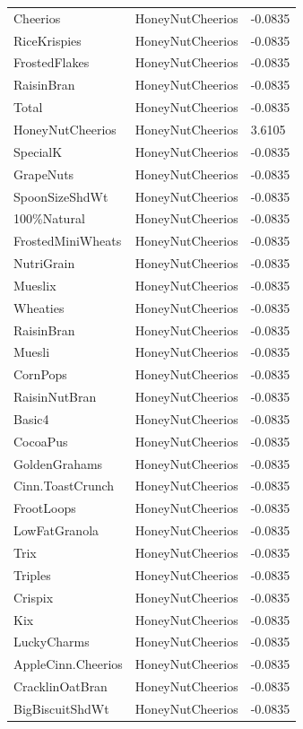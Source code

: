 \begin{table}[!htbp]
\begin{tabular}{lll}
Cheerios & HoneyNutCheerios & -0.0835
\\
RiceKrispies & HoneyNutCheerios & -0.0835
\\
FrostedFlakes & HoneyNutCheerios & -0.0835
\\
RaisinBran & HoneyNutCheerios & -0.0835
\\
Total & HoneyNutCheerios & -0.0835
\\
HoneyNutCheerios & HoneyNutCheerios & 3.6105
\\
SpecialK & HoneyNutCheerios & -0.0835
\\
GrapeNuts & HoneyNutCheerios & -0.0835
\\
SpoonSizeShdWt & HoneyNutCheerios & -0.0835
\\
100\%Natural & HoneyNutCheerios & -0.0835
\\
FrostedMiniWheats & HoneyNutCheerios & -0.0835
\\
NutriGrain & HoneyNutCheerios & -0.0835
\\
Mueslix & HoneyNutCheerios & -0.0835
\\
Wheaties & HoneyNutCheerios & -0.0835
\\
RaisinBran & HoneyNutCheerios & -0.0835
\\
Muesli & HoneyNutCheerios & -0.0835
\\
CornPops & HoneyNutCheerios & -0.0835
\\
RaisinNutBran & HoneyNutCheerios & -0.0835
\\
Basic4 & HoneyNutCheerios & -0.0835
\\
CocoaPus & HoneyNutCheerios & -0.0835
\\
GoldenGrahams & HoneyNutCheerios & -0.0835
\\
Cinn.ToastCrunch & HoneyNutCheerios & -0.0835
\\
FrootLoops & HoneyNutCheerios & -0.0835
\\
LowFatGranola & HoneyNutCheerios & -0.0835
\\
Trix & HoneyNutCheerios & -0.0835
\\
Triples & HoneyNutCheerios & -0.0835
\\
Crispix & HoneyNutCheerios & -0.0835
\\
Kix & HoneyNutCheerios & -0.0835
\\
LuckyCharms & HoneyNutCheerios & -0.0835
\\
AppleCinn.Cheerios & HoneyNutCheerios & -0.0835
\\
CracklinOatBran & HoneyNutCheerios & -0.0835
\\
BigBiscuitShdWt & HoneyNutCheerios & -0.0835

\end{tabular}
\end{table}

